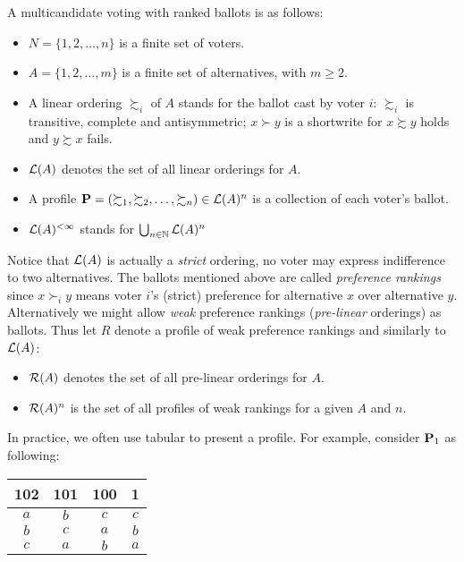 A multicandidate voting with ranked ballots is as follows:
\begin{itemize}
    \item $N = \{1,2, \dots, n\}$ is a finite set of voters.
    \item $A = \{1,2, \dots, m\}$ is a finite set of alternatives, with $m \geq 2$.
    \item A linear ordering $\succsim_i$ of $A$ stands for the ballot cast by voter $i$: $\succsim_i$ is transitive, complete and antisymmetric; $x \succ y$ is a shortwrite for $x \succsim y$ holds and $y \succsim x$ fails.
    \item $\mathcal{L}(A)$ denotes the set of all linear orderings for $A$.
    \item A profile $\mathbf{P} = (\succsim_1,\succsim_2,\dots,\succsim_n) \in \mathcal{L}(A)^n $ is a collection of each voter's ballot.
    \item $\mathcal{L}(A)^{<\infty}$ stands for $\bigcup_{n \in \mathbb{N}} \mathcal{L}(A)^n$
\end{itemize}

Notice that $\mathcal{L}(A)$ is actually a \textit{strict} ordering, no voter may express indifference to two alternatives. The ballots mentioned above are called \textit{preference rankings} since $x \succ_i y$ means voter $i$'s (strict) preference for alternative $x$ over alternative $y$.\\
Alternatively we might allow \textit{weak} preference rankings (\textit{pre-linear} orderings) as ballots. Thus let $R$ denote a profile of weak preference rankings and similarly to $\mathcal{L}(A)$:
\begin{itemize}
    \item $\mathcal{R}(A)$ denotes the set of all pre-linear orderings for $A$.
    \item $\mathcal{R}(A)^n$ is the set of all profiles of weak rankings for a given $A$ and $n$.
\end{itemize}

In practice, we often use tabular to present a profile. For example, consider $\mathbf{P}_1$ as following:
\begin{center}
    \begin{tabular}{cccc}
        102 & 101 & 100 & 1\\
        \hline
        $a$ & $b$ & $c$ & $c$\\
        $b$ & $c$ & $a$ & $b$\\
        $c$ & $a$ & $b$ & $a$
    \end{tabular}
\end{center}

